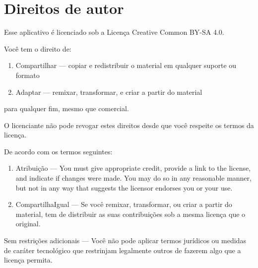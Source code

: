 \section*{Direitos de autor}

Esse aplicativo é licenciado sob a Licença Creative Common BY-SA 4.0.

Você tem o direito de:
\begin{enumerate}
\item  Compartilhar — copiar e redistribuir o material em qualquer suporte ou
  formato
\item Adaptar — remixar, transformar, e criar a partir do material 
\end{enumerate}
para qualquer fim, mesmo que comercial.

O licenciante não pode revogar estes direitos desde que você respeite os termos
da licença.

De acordo com os termos seguintes:
\begin{enumerate}
\item Atribuição — You must give appropriate credit, provide a link to the license, and indicate if changes were made. You may do so in any reasonable manner, but not in any way that suggests the licensor endorses you or your use. 
\item CompartilhaIgual — Se você remixar, transformar, ou criar a partir do material, tem de distribuir as suas contribuições sob a mesma licença que o original. 
\end{enumerate}
Sem restrições adicionais — Você não pode aplicar termos jurídicos ou medidas
de caráter tecnológico que restrinjam legalmente outros de fazerem algo que a
licença permita.
